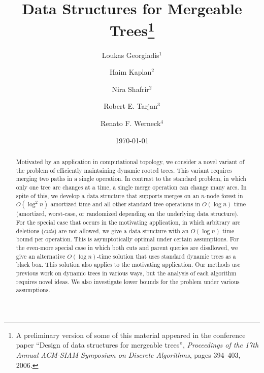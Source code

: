 \documentclass[twoside,leqno,twocolumn]{article}
\begin{document}
\title{\Large Data Structures for Mergeable Trees\footnote{A preliminary version of some of this material appeared in the conference paper ``Design of data structures for mergeable trees'', \emph{Proceedings of the 17th Annual ACM-SIAM Symposium on Discrete Algorithms}, pages 394--403, 2006.}}
\author{Loukas Georgiadis$^{1}$ \and Haim Kaplan$^{2}$ \and Nira Shafrir$^{2}$ \and Robert E. Tarjan$^{3}$ \and Renato F. Werneck$^{4}$}
\date{\today}

\maketitle




\begin{abstract} \small\baselineskip=9pt

Motivated by an application in computational topology, we consider a novel variant of the problem of efficiently maintaining dynamic rooted trees.  This variant requires merging two paths in a single operation.  In contrast to the standard problem, in which only one tree arc changes at a time, a single merge operation can change many arcs.  In spite of this, we develop a data structure that supports merges on an $n$-node forest in $O(\log^2 n)$ amortized time and all other standard tree operations in $O(\log n)$ time (amortized,  worst-case, or randomized depending on the underlying data structure).  For the special case that occurs in the motivating application, in which arbitrary arc deletions (\emph{cuts}) are not allowed, we give a data structure with an $O(\log n)$ time bound per operation.  This is asymptotically optimal under certain assumptions.  For the even-more special case in which both cuts and parent queries are disallowed, we give an alternative $O(\log n)$-time solution that uses standard dynamic trees as a black box. This solution also applies to the motivating application.  Our methods use previous work on dynamic trees in various ways, but the analysis of each algorithm requires novel ideas.  We also investigate lower bounds for the problem under various assumptions.
\end{abstract}
\end{document}
